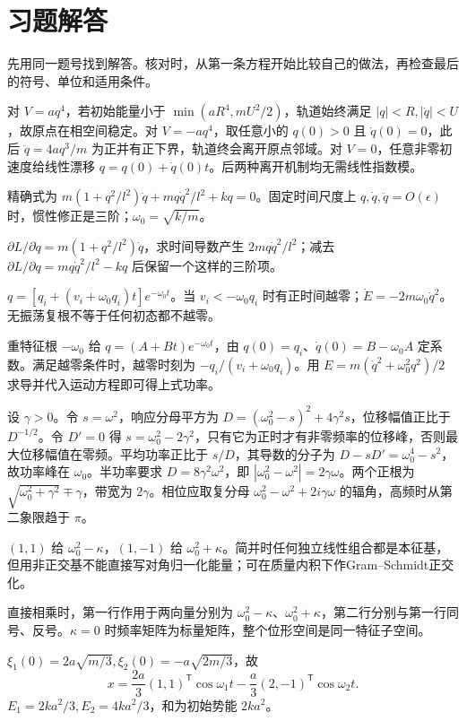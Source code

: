 \section*{习题解答}
先用同一题号找到解答。核对时，从第一条方程开始比较自己的做法，再检查最后的符号、单位和适用条件。
\begin{bookexercises}
\item 对 $V=aq^4$，若初始能量小于 $\min(aR^4,mU^2/2)$，轨道始终满足 $|q|<R,|\dot q|<U$，故原点在相空间稳定。对 $V=-aq^4$，取任意小的 $q(0)>0$ 且 $\dot q(0)=0$，此后 $\ddot q=4aq^3/m$ 为正并有正下界，轨道终会离开原点邻域。对 $V=0$，任意非零初速度给线性漂移 $q=q(0)+\dot q(0)t$。后两种离开机制均无需线性指数模。
\item 精确式为 $m(1+q^2/l^2)\ddot q+mq\dot q^2/l^2+kq=0$。固定时间尺度上 $q,\dot q,\ddot q=O(\epsilon)$ 时，惯性修正是三阶；$\omega_0=\sqrt{k/m}$。

$\partial L/\partial\dot q=m(1+q^2/l^2)\dot q$，求时间导数产生 $2mq\dot q^2/l^2$；减去 $\partial L/\partial q=mq\dot q^2/l^2-kq$ 后保留一个这样的三阶项。
\item $q=[q_i+(v_i+\omega_0q_i)t]e^{-\omega_0t}$。当 $v_i<-\omega_0q_i$ 时有正时间越零；$\dot E=-2m\omega_0\dot q^2$。无振荡复根不等于任何初态都不越零。

重特征根 $-\omega_0$ 给 $q=(A+Bt)e^{-\omega_0t}$，由 $q(0)=q_i$、$\dot q(0)=B-\omega_0A$ 定系数。满足越零条件时，越零时刻为 $-q_i/(v_i+\omega_0q_i)$。用 $E=m(\dot q^2+\omega_0^2q^2)/2$ 求导并代入运动方程即可得上式功率。
\item 设 $\gamma>0$。令 $s=\omega^2$，响应分母平方为 $D=(\omega_0^2-s)^2+4\gamma^2s$，位移幅值正比于 $D^{-1/2}$。令 $D'=0$ 得 $s=\omega_0^2-2\gamma^2$，只有它为正时才有非零频率的位移峰，否则最大位移幅值在零频。平均功率正比于 $s/D$，其导数的分子为 $D-sD'=\omega_0^4-s^2$，故功率峰在 $\omega_0$。半功率要求 $D=8\gamma^2\omega^2$，即 $|\omega_0^2-\omega^2|=2\gamma\omega$。两个正根为 $\sqrt{\omega_0^2+\gamma^2}\mp\gamma$，带宽为 $2\gamma$。相位应取复分母 $\omega_0^2-\omega^2+2i\gamma\omega$ 的辐角，高频时从第二象限趋于 $\pi$。
\item $(1,1)$ 给 $\omega_0^2-\kappa$，$(1,-1)$ 给 $\omega_0^2+\kappa$。简并时任何独立线性组合都是本征基，但用非正交基不能直接写对角归一化能量；可在质量内积下作Gram--Schmidt正交化。

直接相乘时，第一行作用于两向量分别为 $\omega_0^2-\kappa$、$\omega_0^2+\kappa$，第二行分别与第一行同号、反号。$\kappa=0$ 时频率矩阵为标量矩阵，整个位形空间是同一特征子空间。
\item $\xi_1(0)=2a\sqrt{m/3},\xi_2(0)=-a\sqrt{2m/3}$，故
\[
x=\frac{2a}{3}(1,1)^{\mathsf T}\cos\omega_1t
-\frac a3(2,-1)^{\mathsf T}\cos\omega_2t.
\]
$E_1=2ka^2/3,E_2=4ka^2/3$，和为初始势能 $2ka^2$。


\end{bookexercises}

